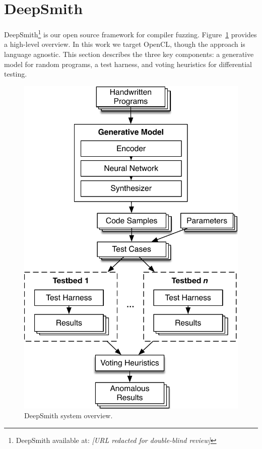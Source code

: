 \section{DeepSmith}

DeepSmith\footnote{DeepSmith available at: \emph{[URL redacted for double-blind review]}} is our open source framework for compiler fuzzing. Figure~\ref{fig:deeptune} provides a high-level overview. In this work we target OpenCL, though the approach is language agnostic. This section describes the three key components: a generative model for random programs, a test harness, and voting heuristics for differential testing.

\begin{figure}
  \centering
  \includegraphics[width=.85\columnwidth]{img/deepsmith} %
  \caption{%
    DeepSmith system overview.
    \vspace{-1.1em}
  }%
  \label{fig:deeptune}
\end{figure}


